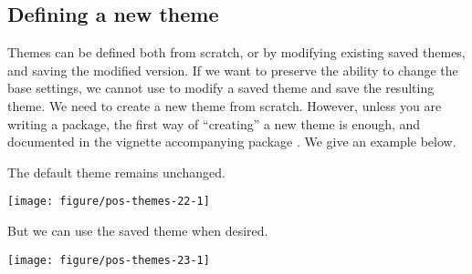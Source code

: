 \documentclass[krantz2]{krantz}\usepackage{knitr}%
\begin{document}
\subsection{Defining a new theme}

Themes can be defined both from scratch, or by modifying existing saved themes, and saving the modified version. If we want to preserve the ability to change the base settings, we cannot use  to modify a saved theme and save the resulting theme. We need to create a new theme from scratch. However, unless you are writing a package, the first way of ``creating'' a new theme is enough, and documented in the vignette accompanying package \ggplot. We give an example below.

\begin{knitrout}\footnotesize
{}\color{fgcolor}\begin{kframe}
\begin{alltt}
 \hlkwb{<-} \hlstd{()} \hlopt{+} \hlstd{(} \hlstd{=} \hlstd{(} \hlstd{=} \hlstd{))}
\end{alltt}
\end{kframe}
\end{knitrout}

The default theme remains unchanged.

\begin{knitrout}\footnotesize
{}\color{fgcolor}\begin{kframe}
\begin{alltt}
\end{alltt}
\end{kframe}

{\centering \texttt{[image: figure/pos-themes-22-1]} 

}



\end{knitrout}

But we can use the saved theme when desired.

\begin{knitrout}\footnotesize
{}\color{fgcolor}\begin{kframe}
\begin{alltt}
 \hlopt{+} 
\end{alltt}
\end{kframe}

{\centering \texttt{[image: figure/pos-themes-23-1]} 

}



\end{knitrout}
\end{document}
